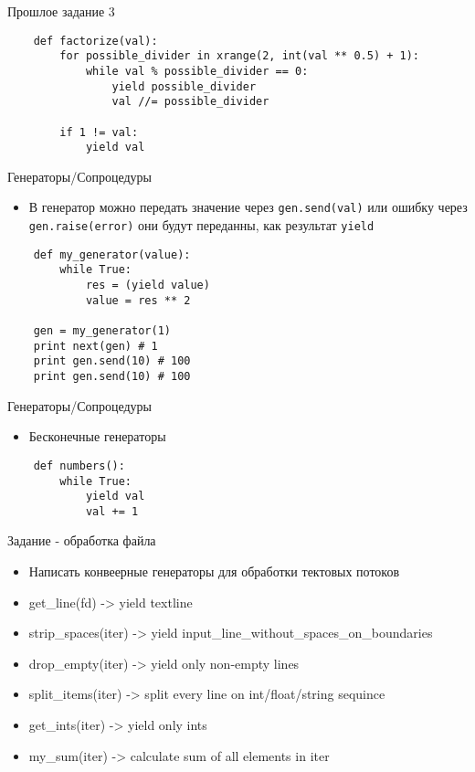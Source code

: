 \documentclass{article}
\begin{document}
{\center Прошлое задание 3}
\begin{lstlisting}
    def factorize(val):
        for possible_divider in xrange(2, int(val ** 0.5) + 1):
            while val % possible_divider == 0:
                yield possible_divider
                val //= possible_divider

        if 1 != val:
            yield val
\end{lstlisting}
\newpage

{\center Генераторы/Сопроцедуры}
\begin{itemize}
    \item В генератор можно передать значение через \lstinline!gen.send(val)!
        или ошибку через \lstinline!gen.raise(error)! они будут переданны, как 
        результат \lstinline!yield!
\end{itemize}
\vspace{15pt}
\begin{lstlisting}
    def my_generator(value):
        while True:
            res = (yield value)
            value = res ** 2

    gen = my_generator(1)
    print next(gen) # 1
    print gen.send(10) # 100
    print gen.send(10) # 100
\end{lstlisting}
\newpage

{\center Генераторы/Сопроцедуры}
\begin{itemize}
    \item Бесконечные генераторы
\end{itemize}
\vspace{15pt}
\begin{lstlisting}
    def numbers():
        while True:
            yield val
            val += 1
\end{lstlisting}
\newpage

{\center Задание - обработка файла}
\begin{itemize}
    \item Написать конвеерные генераторы для обработки тектовых потоков
    \item get\_line(fd) -> yield textline
    \item strip\_spaces(iter) -> yield input\_line\_without\_spaces\_on\_boundaries
    \item drop\_empty(iter) -> yield only non-empty lines
    \item split\_items(iter) -> split every line on int/float/string sequince
    \item get\_ints(iter) -> yield only ints
    \item my\_sum(iter) -> calculate sum of all elements in iter
\end{itemize}
\newpage
\end{document}
